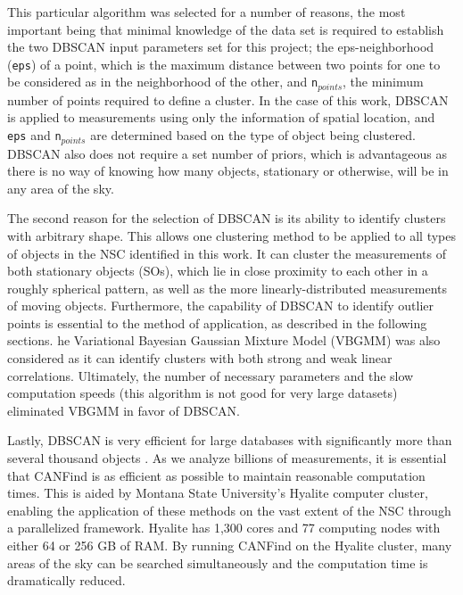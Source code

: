 \documentclass[twocolumn]{aastex62}
\begin{document}
This particular algorithm was selected for a number of reasons, the most important being that minimal knowledge of the data set is required to establish the two DBSCAN input parameters set for this project; the eps-neighborhood (\texttt{eps}) of a point, which is the maximum distance between two points for one to be considered as in the neighborhood of the other, and \texttt{n}$_{points}$, the minimum number of points required to define a cluster.  In the case of this work, DBSCAN is applied to measurements using only the information of spatial location, and \texttt{eps} and \texttt{n}$_{points}$ are determined based on the type of object being clustered.  DBSCAN also does not require a set number of priors, which is advantageous as there is no way of knowing how many objects, stationary or otherwise, will be in any area of the sky.  

The second reason for the selection of DBSCAN is its ability to identify clusters with arbitrary shape.  This allows one clustering method to be applied to all types of objects in the NSC identified in this work.  It can cluster the measurements of both stationary objects (SOs), which lie in close proximity to each other in a roughly spherical pattern, as well as the more linearly-distributed measurements of moving objects.    Furthermore, the capability of DBSCAN to identify outlier points is essential to the method of application, as described in the following sections.  he Variational Bayesian Gaussian Mixture Model (VBGMM) was also considered as it can identify clusters with both strong and weak linear correlations.  Ultimately, the number of necessary parameters and the slow computation speeds (this algorithm is not good for very large datasets) eliminated VBGMM in favor of DBSCAN.  

Lastly, DBSCAN is very efficient for large databases with significantly more than several thousand objects \citep{ester96}.  As we analyze billions of measurements, it is essential that CANFind is as efficient as possible to maintain reasonable computation times.  This is aided by Montana State University's Hyalite computer cluster, enabling the application of these methods on the vast extent of the NSC through a parallelized framework.  Hyalite has 1,300 cores and 77 computing nodes with either 64 or 256 GB of RAM.  By running CANFind on the Hyalite cluster, many areas of the sky can be searched simultaneously and the computation time is dramatically reduced. 
\end{document}
